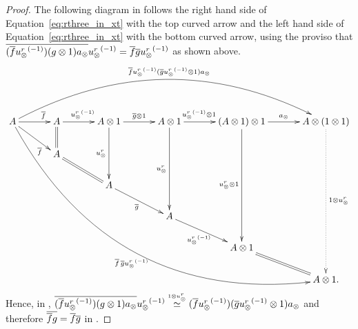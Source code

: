 \begin{proof}
      The following diagram in \X follows the right hand side of Equation~\ref{eq:rthree_in_xt}
      with the top curved arrow and the left hand side of Equation~\ref{eq:rthree_in_xt} with the
      bottom curved arrow, using the proviso that
      $\overline{(\overline{f} {u_{\otimes}^r}^{(-1)}) (g\otimes 1) a_{\otimes}}{u_{\otimes}^r}^{(-1)} = \overline{f}\overline{g}{u_{\otimes}^r}^{(-1)}$ as shown above.
      \[
        \xymatrix @C=33pt @R=20pt{
          A \ar@/^45pt/[rrrrr]^{\restr{f} \inv{\usr}(\restr{g} \inv{\usr} \* 1)a_{\*}}
            \ar@/_65pt/[dddddrrrrr]_{\restr{f}\, \restr{g}\inv{\usr}}
            \ar[r]^(.7){\restr{f}}
            \ar[dr]_(.7){\restr{f}}
            &A \ar[r]^{\inv{\usr}}
            \ar@{=}[d]
            &A \* 1 \ar[r]^{\restr{g}\*1}
            \ar[dd]_{\usr}
            &A \* 1 \ar[r]^(.41){\inv{\usr}\* 1}
            \ar[ddd]_{\usr}
            &(A \* 1) \* 1 \ar[r]^{a_{\*}}
            \ar[dddd]_{\usr\*1}
            & A \* (1\*1) \ar@{.>}[ddddd]^{1\*\usr}\\
          &A\ar@{=}[dr]\\
          &&A \ar[dr]_{\restr{g}}\\
          &&&A \ar[dr]_{\inv\usr}\\
          &&&&A\*1 \ar@{=}[dr]\\
          &&&&&A\*1.
        }
      \]
      Hence, in \X, $\overline{(\overline{f} {u_{\otimes}^r}^{(-1)}) (g\otimes 1) a_{\otimes}} {u_{\otimes}^r}^{(-1)} \overset{\scriptscriptstyle 1\otimes u_{\otimes}^r}{\simeq}
      (\overline{f} {u_{\otimes}^r}^{(-1)}) (\overline{g} {u_{\otimes}^r}^{(-1)}\otimes 1) a_{\otimes}$ and therefore $\overline{\overline{f} g} =
      \overline{f} \overline{g}$ in \Xt.


\end{proof}
